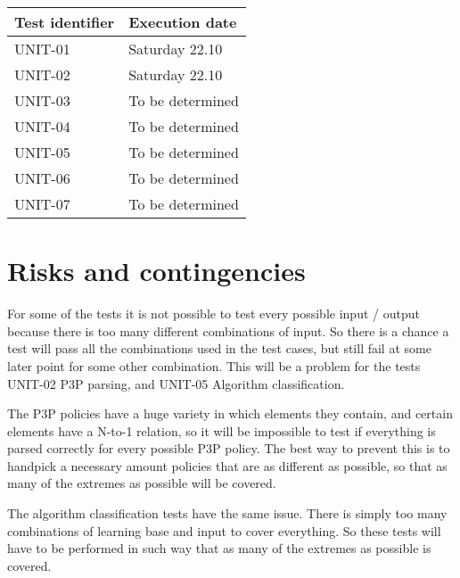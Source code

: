 \documentclass[12pt, fullpage, oneside]{report}
\begin{document}
		\begin{center}
			\begin{tabular}{ |  p{5cm} | p{5cm} | }
				\hline
				Test identifier & Execution date \\ [5pt] \hline \hline
				UNIT-01 & Saturday 22.10 \\  [5pt] \hline
				UNIT-02 & Saturday 22.10 \\  [5pt] \hline
				UNIT-03 & To be determined \\  [5pt] \hline
				UNIT-04 & To be determined \\  [5pt] \hline
				UNIT-05 & To be determined \\  [5pt] \hline
				UNIT-06 & To be determined \\  [5pt] \hline
				UNIT-07 & To be determined \\  [5pt] \hline
			\end{tabular}
		\end{center}

	\section{Risks and contingencies}
		For some of the tests it is not possible to test every possible input / output because there is too many different combinations of input. So there is a chance a test will pass all the combinations used in the test cases, but still fail at some later point for some other combination. This will        		be a problem for the tests UNIT-02 P3P parsing, and UNIT-05 Algorithm classification.

		The P3P policies have a huge variety in which elements they contain, and certain elements have a N-to-1 relation, so it will be impossible to test if everything is parsed correctly for every possible P3P policy. The best way to prevent this is to handpick a necessary amount policies 
		that are as different as possible, so that as many of the extremes as possible will be covered.
	
		The algorithm classification tests have the same issue. There is simply too many combinations of learning base and input to cover everything. So these tests will have to be performed in such way that as many of the extremes as possible is covered.
\end{document}
